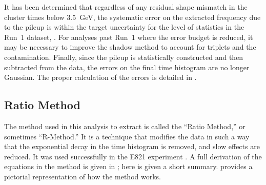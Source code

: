 It has been determined that regardless of any residual shape mismatch in the cluster times below \SI{3.5}{\GeV}, the systematic error on the extracted \wa frequency due to the pileup is within the target uncertainty for the level of statistics in the Run~1 dataset, . For analyses past Run~1 where the error budget is reduced, it may be necessary to improve the shadow method to account for triplets and the contamination. Finally, since the pileup is statistically constructed and then subtracted from the data, the errors on the final time histogram are no longer Gaussian. The proper calculation of the errors is detailed in .





\subsection{Ratio Method}
\label{sub:ratio_method}


The method used in this analysis to extract \wa is called the ``Ratio Method,'' or sometimes ``R-Method.'' It is a technique that modifies the data in such a way that the exponential decay in the time histogram is removed, and slow effects are reduced. It was used successfully in the E821 experiment \cite{JKThesis,LDThesis,JPThesis}. A full derivation of the equations in the method is given in ; here is given a short summary.  provides a pictorial representation of how the method works.

